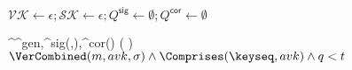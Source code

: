   \State$\mathcal{VK} \gets \epsilon; \mathcal{SK} \gets \epsilon;
         Q^\textsf{sig} \gets \emptyset;
         Q^\textsf{cor} \gets \emptyset$

    {^{^\textsf{gen},^\textsf{sig}(\cdot,\cdot),^\textsf{cor}(\cdot)}
      \left(
        \params
      \right)
    }
    \EndIf
  \EndFor
  \State\Return$\VerCombined(m, avk, \sigma) \land \Comprises(\keyseq, avk) \land q < t$
\EndFunction
